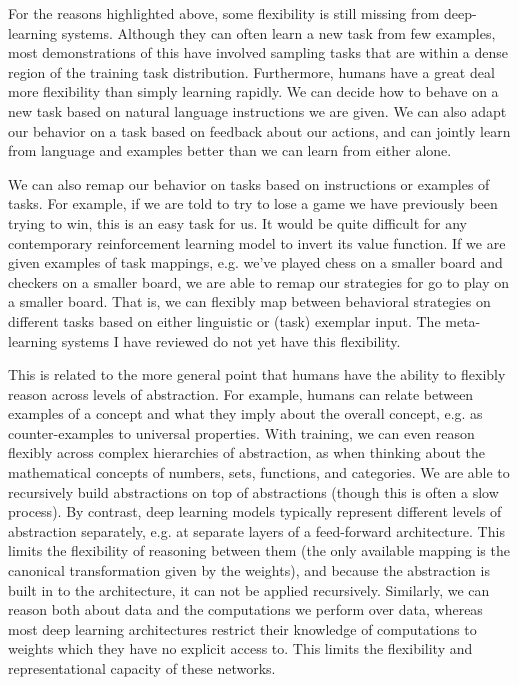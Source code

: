 \documentclass[11pt]{article}
\begin{document}
For the reasons highlighted above, some flexibility is still missing from deep-learning systems. Although they can often learn a new task from few examples, most demonstrations of this have involved sampling tasks that are within a dense region of the training task distribution. Furthermore, humans have a great deal more flexibility than simply learning rapidly. We can decide how to behave on a new task based on natural language instructions we are given. We can also adapt our behavior on a task based on feedback about our actions, and can jointly learn from language and examples better than we can learn from either alone. \par
We can also remap our behavior on tasks based on instructions or examples of tasks. For example, if we are told to try to lose a game we have previously been trying to win, this is an easy task for us. It would be quite difficult for any contemporary reinforcement learning model to invert its value function. If we are given examples of task mappings, e.g. we've played chess on a smaller board and checkers on a smaller board, we are able to remap our strategies for go to play on a smaller board. That is, we can flexibly map between behavioral strategies on different tasks based on either linguistic or (task) exemplar input. The meta-learning systems I have reviewed do not yet have this flexibility. \par
This is related to the more general point that humans have the ability to flexibly reason across levels of abstraction. For example, humans can relate between examples of a concept and what they imply about the overall concept, e.g. as counter-examples to universal properties. With training, we can even reason flexibly across complex hierarchies of abstraction, as when thinking about the mathematical concepts of numbers, sets, functions, and categories. We are able to recursively build abstractions on top of abstractions (though this is often a slow process). By contrast, deep learning models typically represent different levels of abstraction separately, e.g. at separate layers of a feed-forward architecture. This limits the flexibility of reasoning between them (the only available mapping is the canonical transformation given by the weights), and because the abstraction is built in to the architecture, it can not be applied recursively. Similarly, we can reason both about data and the computations we perform over data, whereas most deep learning architectures restrict their knowledge of computations to weights which they have no explicit access to. This limits the flexibility and representational capacity of these networks. \par 
\end{document}

